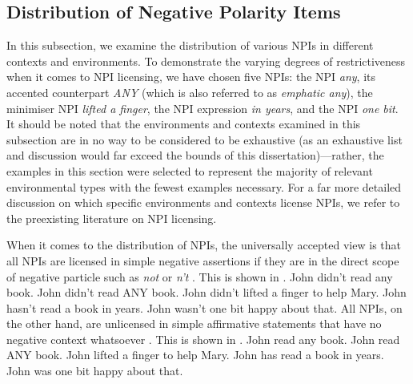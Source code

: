 \subsection{Distribution of Negative Polarity Items}
In this subsection, we examine the distribution of various NPIs in different contexts and environments. To demonstrate the varying degrees of restrictiveness when it comes to NPI licensing, we have chosen five NPIs: the NPI \textit{any}, its accented counterpart \textit{\MakeUppercase{any}} (which is also referred to as \textit{emphatic any}), the minimiser NPI \textit{lifted a finger}, the NPI expression \textit{in years}, and the NPI \textit{one bit}. It should be noted that the environments and contexts examined in this subsection are in no way to be considered to be exhaustive (as an exhaustive list and discussion would far exceed the bounds of this dissertation)---rather, the examples in this section were selected to represent the majority of relevant environmental types with the fewest examples necessary. For a far more detailed discussion on which specific environments and contexts license NPIs, we refer to the preexisting literature on NPI licensing.

When it comes to the distribution of NPIs, the universally accepted view is that all NPIs are licensed in simple negative assertions if they are in the direct scope of negative particle such as \textit{not} or \textit{n't} \parencite[see, amongst many others,][]{Jespersen1917,Klima1964,Baker1969,Baker1970}. This is shown in .
\pex[nopreamble=true]\label{ex:npi-negation}%
\a{} John didn't read any book.
\a{} John didn't read \MakeUppercase{any} book.
\a{} John didn't lifted a finger to help Mary.
\a{} John hasn't read a book in years.
\a{} John wasn't one bit happy about that.
\xe
All NPIs, on the other hand, are unlicensed in simple affirmative statements that have no negative context whatsoever \parencite[see, amongst many others,][]{Jespersen1917,Klima1964,Baker1969,Baker1970}. This is shown in .
\pex[nopreamble=true]\label{ex:npi-um}%
\a{}\ljudge{\#} John read any book.
\a{}\ljudge{\#} John read \MakeUppercase{any} book.
\a{}\ljudge{\#} John lifted a finger to help Mary.
\a{}\ljudge{\#} John has read a book in years.
\a{}\ljudge{\#} John was one bit happy about that.
\xe

